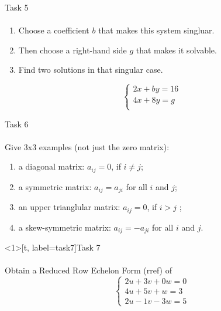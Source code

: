 \documentclass[aspectratio=169]{beamer}
\begin{document}
\begin{frame}[t]{Task 5}
\framesubtitle{}
    \begin{enumerate}
        \item Choose a coefficient $b$ that makes this system singluar.
        \item Then choose a right-hand side $g$ that makes it solvable.
        \item Find two solutions in that singular case.
    \end{enumerate}
    \begin{equation*}
        \left\{\begin{matrix}
            2x + by = 16 \\ 
            4x + 8y = g \\ 
            \end{matrix}\right.
    \end{equation*}    
\end{frame}

\begin{frame}[t]{Task 6}
\framesubtitle{}
    Give 3x3 examples (not just the zero matrix):
    \begin{enumerate}
        \item a diagonal matrix: $a_{ij}=0$, if $i \neq j$;
        \item a symmetric matrix: $a_{ij} = a_{ji}$ for all $i$ and $j$;
        \item an upper trianglular matrix: $a_{ij}=0$, if $i>j$ ;
        \item a skew-symmetric matrix: $a_{ij} = -a_{ji}$ for all $i$ and $j$.
    \end{enumerate}
\end{frame}

\begin{frame}<1>[t, label=task7]{Task 7}
\framesubtitle{}
    Obtain a Reduced Row Echelon Form (rref) of
    \begin{equation*}
        \left\{\begin{matrix}
            2u + 3v + 0w = 0 \\ 
            4u + 5v + w = 3 \\ 
            2u - 1v - 3w = 5 
            \end{matrix}\right.
        \end{equation*}

\end{frame}
\end{document}
